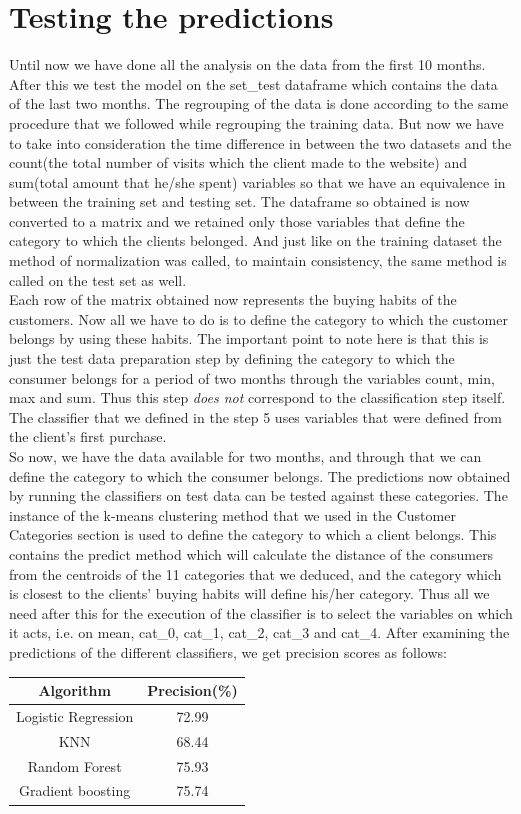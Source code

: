 \section*{Testing the predictions}
Until now we have done all the analysis on the data from the first 10 months. After this we test the model on the set\_test dataframe which contains the data of the last two months. The regrouping of the data is done according to the same procedure that we followed while regrouping the training data. But now we have to take into consideration the time difference in between the two datasets and the count(the total number of visits which the client made to the website) and sum(total amount that he/she spent) variables so that we have an equivalence in between the training set and testing set. The dataframe so obtained is now converted to a matrix and we retained only those variables that define the category to which the clients belonged. And just like on the training dataset the method of normalization was called, to maintain consistency, the same method is called on the test set as well.\\
Each row of the matrix obtained now represents the buying habits of the customers. Now all we have to do is to define the category to which the customer belongs by using these habits. The important point to note here is that this is just the test data preparation step by defining the category to which the consumer belongs for a period of two months through the variables count, min, max and sum. Thus this step \emph{does not} correspond to the classification step itself. The classifier that we defined in the step 5 uses variables that were defined from the client's first purchase.\\
So now, we have the data available for two months, and through that we can define the category to which the consumer belongs. The predictions now obtained by running the classifiers on test data can be tested against these categories. The instance of the k-means clustering method that we used in the Customer Categories section is used to define the category to which a client belongs. This contains the predict method which will calculate the distance of the consumers from the centroids of the 11 categories that we deduced, and the category which is closest to the clients' buying habits will define his/her category. Thus all we need after this for the execution of the classifier is to select the variables on which it acts, i.e. on mean, cat\_0, cat\_1, cat\_2, cat\_3 and cat\_4. After examining the predictions of the different classifiers, we get precision scores as follows:\\ 
\begin{center}
 \begin{tabular}{|c | c|} 
 \hline
 Algorithm & Precision(\%) \\ [0.5ex] 
 \hline
 Logistic Regression & 72.99\\ 
 \hline
 KNN & 68.44 \\
 \hline
 Random Forest & 75.93 \\
 \hline
 Gradient boosting & 75.74 \\
 \hline
 
\end{tabular}
\end{center}

